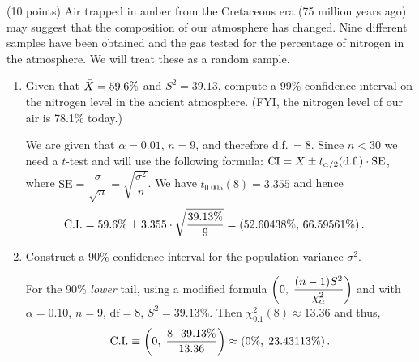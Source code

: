 (10 points) Air trapped in amber from the Cretaceous era (75 million years ago) may
suggest that the composition of our atmosphere has changed. Nine different samples
have been obtained and the gas tested for the percentage of nitrogen in the atmosphere.
We will treat these as a random sample.
\begin{enumerate}[label=(\alph*)]
\item Given that $\bar{X} = 59.6\%$ and $S^2 = 39.13$, compute a 99\% confidence interval on the
nitrogen level in the ancient atmosphere. (FYI, the nitrogen level of our air is 78.1\%
today.)
\begin{mybox}
    We are given that $\alpha = 0.01$, $n=9$, and therefore d.f.$\,= 8$. Since $n < 30$ we need a $t$-test and will use the following formula: $\text{CI} = \bar{X} \pm t_{\alpha/2}(\text{d.f.}) \cdot \text{SE}$, where $\text{SE} = \dfrac{\sigma}{\sqrt{n}} = \sqrt{\dfrac{\sigma^2}{n}}$. We have $t_{0.005}(8) = 3.355$ and hence
    \begin{align*}
        \text{C.I.} &= 59.6\% \pm 3.355 \cdot \sqrt{\frac{39.13\%}{9}} = \left( {52.60438\%,\, 66.59561\%} \right).
    \end{align*}
\end{mybox}


\item Construct a 90\% confidence interval for the population variance $\sigma^2$.
\begin{mybox}
    For the 90\% \textit{lower} tail, using a modified formula $\displaystyle \left( {0, \; \dfrac{(n-1)S^2}{\chi^2_{\alpha}}} \right)$ and with $\alpha = 0.10$, $n=9$, $\text{df}=8$, $S^2 = 39.13\%$. Then $\chi^2_{0.1}(8) \approx 13.36$ and thus, $$\text{C.I.} \equiv \left( {0, \; \dfrac{8\cdot 39.13\%}{13.36}} \right) \approx \left( {0\%,\; 23.43113\%} \right).$$
\end{mybox}
\end{enumerate}